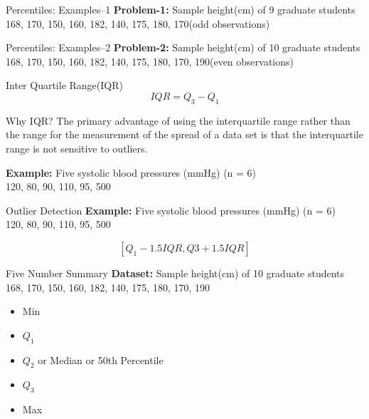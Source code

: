\begin{frame}[t]{Percentiles: Examples--1}
\textbf{Problem-1:} Sample height(cm) of 9 graduate students 168, 170, 150, 
160, 182, 140, 175, 180, 170(odd observations)
\end{frame}


\begin{frame}[t]{Percentiles: Examples--2}
	\textbf{Problem-2:} Sample height(cm) of 10 graduate students 168, 170, 
	150, 
	160, 182, 140, 175, 180, 170, 190(even observations)
\end{frame}



\begin{frame}[t]{Inter Quartile Range(IQR)}
	$$
	IQR = Q_3 - Q_1
	$$
\end{frame}

\begin{frame}[t]{Why IQR?}
	The primary advantage of using the interquartile range rather than the 
	range for the
	measurement of the spread of a data set is that the interquartile range is 
	not sensitive to outliers.
	
	\textbf{Example:}	Five systolic blood pressures (mmHg) (n = 6) \\
	120, 80, 90, 110, 95, 500
\end{frame}

\begin{frame}[t]{Outlier Detection}
	\textbf{Example:}	Five systolic blood pressures (mmHg) (n = 6) \\
	120, 80, 90, 110, 95, 500
	
	$$
	[Q_1 - 1.5IQR, Q3+1.5IQR]
	$$
	
	
	
\end{frame}


\begin{frame}[t]{Five Number Summary}
	\textbf{Dataset:} Sample height(cm) of 10 graduate students 168, 170, 
	150, 160, 182, 140, 175, 180, 170, 190
	
	\begin{itemize}
		\item Min
		\item $Q_1$
		\item $Q_2$ or Median or 50th Percentile
		\item $Q_3$
		\item Max
	\end{itemize}
\end{frame}




